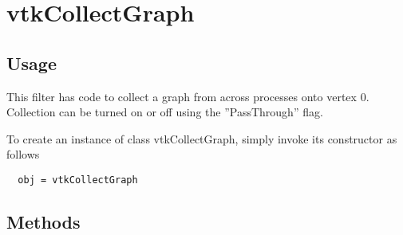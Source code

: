 \section{vtkCollectGraph}

\subsection{Usage}

 This filter has code to collect a graph from across processes onto vertex 0.
 Collection can be turned on or off using the ''PassThrough'' flag.

To create an instance of class vtkCollectGraph, simply
invoke its constructor as follows
\begin{verbatim}
  obj = vtkCollectGraph
\end{verbatim}
\subsection{Methods}

